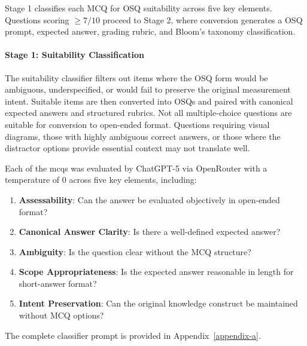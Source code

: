Stage 1 classifies each MCQ for OSQ suitability across five key elements. Questions scoring $\geq 7/10$ proceed to Stage 2, where conversion generates a OSQ prompt, expected answer, grading rubric, and Bloom's taxonomy classification. 

\paragraph{Stage 1: Suitability Classification}

The suitability classifier filters out items where the OSQ form would be ambiguous, underspecified, or would fail to preserve the original measurement intent. Suitable items are then converted into OSQs and paired with canonical expected answers and structured rubrics.
Not all multiple-choice questions are suitable for conversion to open-ended format. Questions requiring visual diagrams, those with highly ambiguous correct answers, or those where the distractor options provide essential context may not translate well.

Each of the \acp{mcq} was evaluated by ChatGPT-5 via OpenRouter with a temperature of 0 across five key elements, including:

\begin{enumerate}
    \item \textbf{Assessability}: Can the answer be evaluated objectively in open-ended format?
    \item \textbf{Canonical Answer Clarity}: Is there a well-defined expected answer?
    \item \textbf{Ambiguity}: Is the question clear without the MCQ structure?
    \item \textbf{Scope Appropriateness}: Is the expected answer reasonable in length for short-answer format?
    \item \textbf{Intent Preservation}: Can the original knowledge construct be maintained without MCQ options?
\end{enumerate}

The complete classifier prompt is provided in Appendix~\ref{appendix-a}.




